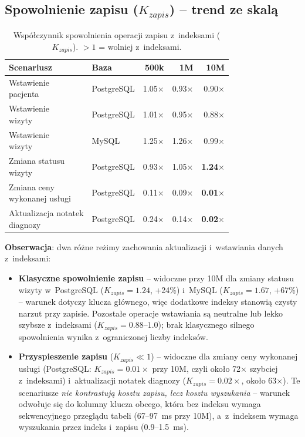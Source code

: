 \documentclass[12pt,a4paper]{article}
\begin{document}
\subsection{Spowolnienie zapisu \texorpdfstring{($K_{zapis}$)}{(K zapis)} -- trend ze skalą}
\label{sec:kwrite}

\begin{table}[H]
\centering
\caption{Współczynnik spowolnienia operacji zapisu z~indeksami ($K_{zapis}$). $>1$ = wolniej z~indeksami.}
\label{tab:kwrite}
\small
\begin{tabular}{@{}llrrr@{}}
\toprule
\textbf{Scenariusz} & \textbf{Baza} & \textbf{500k} & \textbf{1M} & \textbf{10M} \\
\midrule
\shortstack[l]{Wstawienie\\pacjenta} & PostgreSQL & 1.05$\times$ & 0.93$\times$ & 0.90$\times$ \\
\shortstack[l]{Wstawienie\\wizyty} & PostgreSQL & 1.01$\times$ & 0.95$\times$ & 0.88$\times$ \\
\shortstack[l]{Wstawienie\\wizyty} & MySQL & 1.25$\times$ & 1.26$\times$ & 0.99$\times$ \\
\shortstack[l]{Zmiana statusu\\wizyty} & PostgreSQL & 0.93$\times$ & 1.05$\times$ & \textbf{1.24$\times$} \\
\shortstack[l]{Zmiana ceny\\wykonanej usługi} & PostgreSQL & 0.11$\times$ & 0.09$\times$ & \textbf{0.01$\times$} \\
\shortstack[l]{Aktualizacja notatek\\diagnozy} & PostgreSQL & 0.24$\times$ & 0.14$\times$ & \textbf{0.02$\times$} \\
\bottomrule
\end{tabular}
\end{table}

\textbf{Obserwacja}: dwa różne reżimy zachowania aktualizacji i~wstawiania danych z~indeksami:
\begin{itemize}[noitemsep]
    \item \textbf{Klasyczne spowolnienie zapisu} -- widoczne przy 10M dla zmiany statusu wizyty w~PostgreSQL ($K_{zapis}=1.24$, +24\%) i~MySQL ($K_{zapis}=1.67$, +67\%) -- warunek dotyczy klucza głównego, więc dodatkowe indeksy stanowią czysty narzut przy zapisie. Pozostałe operacje wstawiania są neutralne lub lekko szybsze z~indeksami ($K_{zapis}=0.88$--$1.0$); brak klasycznego silnego spowolnienia wynika z~ograniczonej liczby indeksów.
    \item \textbf{Przyspieszenie zapisu} ($K_{zapis} \ll 1$) -- widoczne dla zmiany ceny wykonanej usługi (PostgreSQL: $K_{zapis}=0.01\times$ przy 10M, czyli około 72$\times$ szybciej z~indeksami) i~aktualizacji notatek diagnozy ($K_{zapis}=0.02\times$, około 63$\times$). Te scenariusze \emph{nie kontrastują kosztu zapisu, lecz kosztu wyszukania} -- warunek odwołuje się do kolumny klucza obcego, która bez indeksu wymaga sekwencyjnego przeglądu tabeli (67--97~ms przy 10M), a~z~indeksem wymaga wyszukania przez indeks i~zapisu (0.9--1.5~ms).
\end{itemize}
\end{document}
